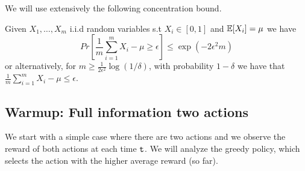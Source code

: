 

We will use extensively the following concentration bound.

\begin{theorem}
\label{thm:hoeffding}
%
Given $X_{1},\dots,X_{m}$ i.i.d random
variables s.t $X_{i}\in[0,1]$ and $\mathbb{E}[X_{i}]=\mu$ we have
\[
Pr[\frac{1}{m} \sum_{i=1}^{m}X_{i}-\mu \ge\epsilon] \le  \exp(-2\epsilon^{2}m)
\]
or alternatively, for $m\geq \frac{1}{2\epsilon^2}\log(1/\delta)$, with probability $1-\delta$ we have that $\frac{1}{m} \sum_{i=1}^{m}X_{i}-\mu \le\epsilon$.
\end{theorem}


\subsection{Warmup: Full information two actions }

We start with a simple case where there are two actions and we
observe the reward of both actions at each time ${\tt t}$. We will analyze
the greedy policy, which selects the action with the higher average
reward (so far).

